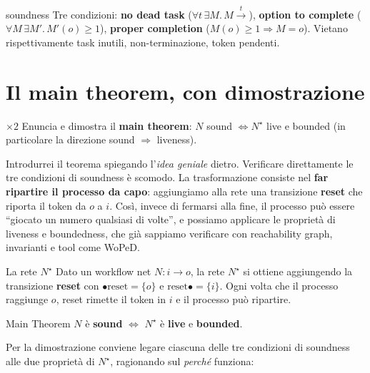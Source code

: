 \begin{puntochiave}{soundness}
Tre condizioni: \textbf{no dead task} ($\forall t\,\exists M.\,M\xrightarrow{t}$), \textbf{option to complete} ($\forall M\,\exists M'.\,M'(o)\ge 1$), \textbf{proper completion} ($M(o)\ge 1 \Rightarrow M=o$). Vietano rispettivamente task inutili, non-terminazione, token pendenti.
\end{puntochiave}

\section{Il main theorem, con dimostrazione}

\begin{domanda}{$\times 2$}
Enuncia e dimostra il \textbf{main theorem}: $N$ sound $\iff N^\star$ live e bounded (in particolare la direzione sound $\Rightarrow$ liveness).
\end{domanda}

Introdurrei il teorema spiegando l'\emph{idea geniale} dietro. Verificare direttamente le tre condizioni di soundness è scomodo. La trasformazione consiste nel \textbf{far ripartire il processo da capo}: aggiungiamo alla rete una transizione \textbf{reset} che riporta il token da $o$ a $i$. Così, invece di fermarsi alla fine, il processo può essere ``giocato un numero qualsiasi di volte'', e possiamo applicare le proprietà di liveness e boundedness, che già sappiamo verificare con reachability graph, invarianti e tool come WoPeD.

\begin{definizione}{La rete $N^\star$}
Dato un workflow net $N : i \to o$, la rete $N^\star$ si ottiene aggiungendo la transizione \textbf{reset} con $\bullet\text{reset} = \{o\}$ e $\text{reset}\bullet = \{i\}$. Ogni volta che il processo raggiunge $o$, reset rimette il token in $i$ e il processo può ripartire.
\end{definizione}

\begin{teorema}{Main Theorem}
$N$ è \textbf{sound} $\iff$ $N^\star$ è \textbf{live} e \textbf{bounded}.
\end{teorema}

Per la dimostrazione conviene legare ciascuna delle tre condizioni di soundness alle due proprietà di $N^\star$, ragionando sul \emph{perché} funziona:

